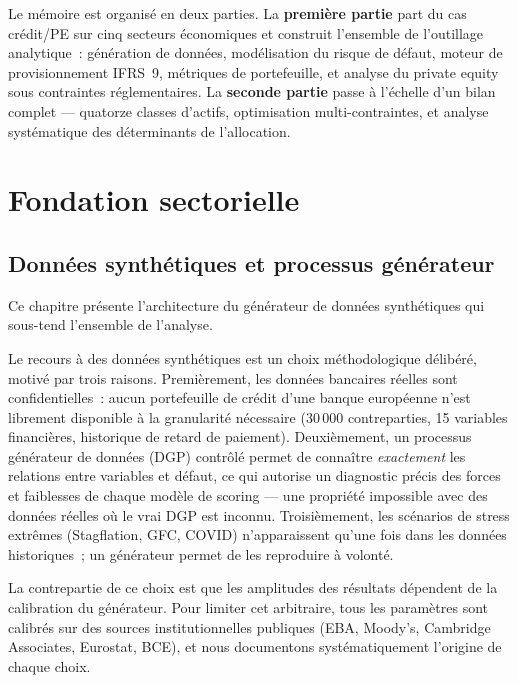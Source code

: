 \documentclass[12pt, a4paper, twoside, openright]{report}
\theoremstyle{definition}
\begin{document}
Le mémoire est organisé en deux parties.
La \textbf{première partie} part du cas crédit/PE sur cinq secteurs économiques et construit l'ensemble de l'outillage analytique~: génération de données, modélisation du risque de défaut, moteur de provisionnement IFRS~9, métriques de portefeuille, et analyse du private equity sous contraintes réglementaires.
La \textbf{seconde partie} passe à l'échelle d'un bilan complet --- quatorze classes d'actifs, optimisation multi-contraintes, et analyse systématique des déterminants de l'allocation.


\part{Fondation sectorielle}
\label{part:fondation}


\chapter{Données synthétiques et processus générateur}
\label{chap:donnees}

Ce chapitre présente l'architecture du générateur de données synthétiques qui sous-tend l'ensemble de l'analyse.

Le recours à des données synthétiques est un choix méthodologique délibéré, motivé par trois raisons.
Premièrement, les données bancaires réelles sont confidentielles~: aucun portefeuille de crédit d'une banque européenne n'est librement disponible à la granularité nécessaire (30\,000 contreparties, 15 variables financières, historique de retard de paiement).
Deuxièmement, un processus générateur de données (DGP) contrôlé permet de connaître \emph{exactement} les relations entre variables et défaut, ce qui autorise un diagnostic précis des forces et faiblesses de chaque modèle de scoring --- une propriété impossible avec des données réelles où le vrai DGP est inconnu.
Troisièmement, les scénarios de stress extrêmes (Stagflation, GFC, COVID) n'apparaissent qu'une fois dans les données historiques~; un générateur permet de les reproduire à volonté.

La contrepartie de ce choix est que les amplitudes des résultats dépendent de la calibration du générateur.
Pour limiter cet arbitraire, tous les paramètres sont calibrés sur des sources institutionnelles publiques (EBA, Moody's, Cambridge Associates, Eurostat, BCE), et nous documentons systématiquement l'origine de chaque choix.
\end{document}
